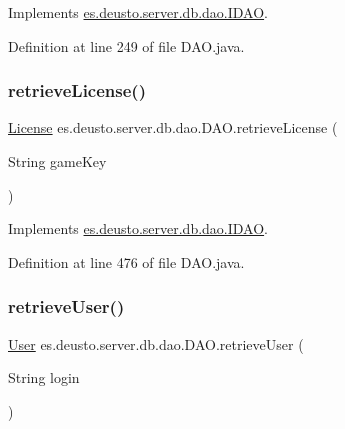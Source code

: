 Implements \hyperlink{interfacees_1_1deusto_1_1server_1_1db_1_1dao_1_1_i_d_a_o_aecdf5c34463102b38528152c0dfc9811}{es.\+deusto.\+server.\+db.\+dao.\+I\+D\+AO}.



Definition at line 249 of file D\+A\+O.\+java.

\mbox{\label{classes_1_1deusto_1_1server_1_1db_1_1dao_1_1_d_a_o_a02fd634e6bd7a087b1476ab161af646f}} 
\subsubsection{\texorpdfstring{retrieve\+License()}{retrieveLicense()}}
{\footnotesize\ttfamily \hyperlink{classes_1_1deusto_1_1server_1_1db_1_1data_1_1_license}{License} es.\+deusto.\+server.\+db.\+dao.\+D\+A\+O.\+retrieve\+License (\begin{DoxyParamCaption}\item[{String}]{game\+Key }\end{DoxyParamCaption})}



Implements \hyperlink{interfacees_1_1deusto_1_1server_1_1db_1_1dao_1_1_i_d_a_o_a6a3e25055d4a81c738d1bd73de6ef7da}{es.\+deusto.\+server.\+db.\+dao.\+I\+D\+AO}.



Definition at line 476 of file D\+A\+O.\+java.

\mbox{\label{classes_1_1deusto_1_1server_1_1db_1_1dao_1_1_d_a_o_a8c316b4c3bf246d00fb2b423a603ebe6}} 
\subsubsection{\texorpdfstring{retrieve\+User()}{retrieveUser()}}
{\footnotesize\ttfamily \hyperlink{classes_1_1deusto_1_1server_1_1db_1_1data_1_1_user}{User} es.\+deusto.\+server.\+db.\+dao.\+D\+A\+O.\+retrieve\+User (\begin{DoxyParamCaption}\item[{String}]{login }\end{DoxyParamCaption})}



